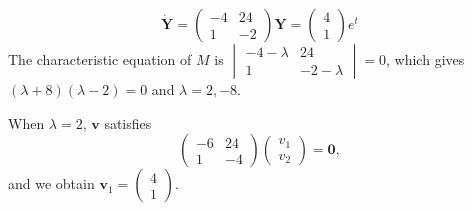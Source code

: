\documentclass[a4paper]{article}
\begin{document}
\begin{eg}
  \[
    \mathbf{\dot{Y}} =
    \begin{pmatrix}
      -4 & 24\\
      1 & -2
    \end{pmatrix}
    \mathbf{Y} =
    \begin{pmatrix}
      4\\1
    \end{pmatrix}e^t
  \]
  The characteristic equation of $M$ is $
  \begin{vmatrix}
    -4 - \lambda & 24\\
    1 & -2 - \lambda
  \end{vmatrix} = 0$, which gives $(\lambda + 8)(\lambda - 2) = 0$ and $\lambda = 2, -8$.

  When $\lambda = 2$, $\mathbf{v}$ satisfies
  \[
    \begin{pmatrix}
      -6 & 24\\
      1 & -4
    \end{pmatrix}
    \begin{pmatrix}
      v_1\\v_2
    \end{pmatrix} = \mathbf{0},
  \]
  and we obtain $\mathbf{v}_1 =
  \begin{pmatrix}
    4\\1
  \end{pmatrix}$.


\end{eg}
\end{document}

